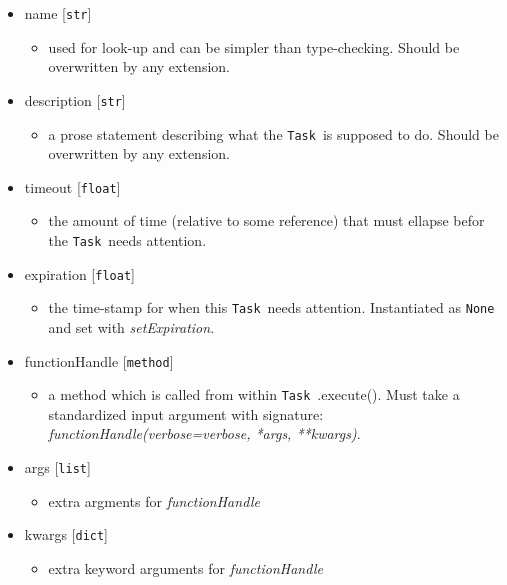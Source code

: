 \documentclass{article}
\newcommand{\Task}{\texttt{Task}~}
\begin{document}
\begin{itemize}
    \item{name [\texttt{str}]
        \begin{itemize}
            \item{used for look-up and can be simpler than type-checking. Should be overwritten by any extension.}
        \end{itemize}
         }
    \item{description [\texttt{str}]
        \begin{itemize}
            \item{a prose statement describing what the \Task is supposed to do. Should be overwritten by any extension.}
        \end{itemize}
         }
    \item{timeout [\texttt{float}]
        \begin{itemize}
            \item{the amount of time (relative to some reference) that must ellapse befor the \Task needs attention.}
        \end{itemize}
         }
    \item{expiration [\texttt{float}]
        \begin{itemize}
            \item{the time-stamp for when this \Task needs attention. Instantiated as \texttt{None} and set with \textit{setExpiration}.}
        \end{itemize}
         }
    \item{functionHandle [\texttt{method}]
        \begin{itemize}
            \item{a method which is called from within \Task.execute(). Must take a standardized input argument with signature: \textit{functionHandle(verbose=verbose, *args, **kwargs)}.}
        \end{itemize}
         }
    \item{args [\texttt{list}]
        \begin{itemize}
            \item{extra argments for \textit{functionHandle}}
        \end{itemize}
         }
    \item{kwargs [\texttt{dict}]
        \begin{itemize}
            \item{extra keyword arguments for \textit{functionHandle}}
        \end{itemize}
         }
\end{itemize}
\end{document}
